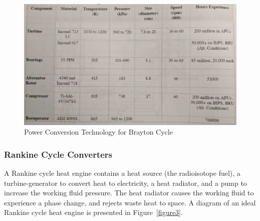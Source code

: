 \documentclass{article}
\begin{document}
\begin{figure}[]
	\centering
	\includegraphics[height=0.45\textheight]{fig/table6}
	\caption[Power Conversion Technology for Brayton Cycle]{Power Conversion Technology for Brayton Cycle~\cite{buden2011spacebook1}}
	\label{table6}
\end{figure}


\subsubsection{Rankine Cycle Converters}

A Rankine cycle heat engine contains a heat source (the radioisotope fuel), a turbine-generator to convert heat to electricity, a heat radiator, and a pump to increase the working fluid pressure. The heat radiator causes the working fluid to experience a phase change, and rejects waste heat to space. A diagram of an ideal Rankine cycle heat engine is presented in Figure~\ref{figure3}.
\end{document}
